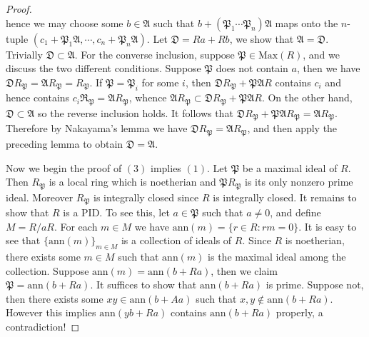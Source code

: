 \begin{proof}
$$$$
hence we may choose some $b\in\mathfrak{A}$ such that $b+(\mathfrak{P}_1\cdots\mathfrak{P}_n)\mathfrak{A}$ maps onto the $n$-tuple $(c_1+\mathfrak{P}_1\mathfrak{A},\cdots,c_n+\mathfrak{P}_n\mathfrak{A})$. Let $\mathfrak{D}=Ra+Rb$, we show that $\mathfrak{A}=\mathfrak{D}$. Trivially $\mathfrak{D}\subset\mathfrak{A}$. For the converse inclusion, suppose $\mathfrak{P}\in\mathrm{Max}(R)$, and we discuss the two different conditions. Suppose $\mathfrak{P}$ does not contain $a$, then we have $\mathfrak{D}R_\mathfrak{P}=\mathfrak{A}R_\mathfrak{P}=R_\mathfrak{P}$. If $\mathfrak{P}=\mathfrak{P}_i$ for some $i$, then $\mathfrak{D}R_\mathfrak{P}+\mathfrak{P}\mathfrak{A}R$ contains $c_i$ and hence contains $c_i\mathfrak{R}_\mathfrak{P}=\mathfrak{A}R_\mathfrak{P}$, whence $\mathfrak{A}R_\mathfrak{P}\subset\mathfrak{D}R_\mathfrak{P}+\mathfrak{P}\mathfrak{A}R$. On the other hand, $\mathfrak{D}\subset\mathfrak{A}$ so the reverse inclusion holds. It follows that $\mathfrak{D}R_\mathfrak{P}+\mathfrak{P}\mathfrak{A}R_\mathfrak{P}=\mathfrak{A}R_\mathfrak{P}$. Therefore by Nakayama's lemma we have $\mathfrak{D}R_\mathfrak{P}=\mathfrak{A}R_\mathfrak{P}$, and then apply the preceding lemma to obtain $\mathfrak{D}=\mathfrak{A}$.\par
Now we begin the proof of $(3)$ implies $(1)$. Let $\mathfrak{P}$ be a maximal ideal of $R$. Then $R_\mathfrak{P}$ is a local ring which is noetherian and $\mathfrak{P}R_\mathfrak{P}$ is its only nonzero prime ideal. Moreover $R_\mathfrak{P}$ is integrally closed since $R$ is integrally closed. It remains to show that $R$ is a PID. To see this, let $a\in\mathfrak{P}$ such that $a\ne 0$, and define $M=R/aR$. For each $m\in M$ we have $\mathrm{ann}(m)=\{r\in R:rm=0\}$. It is easy to see that $\{\mathrm{ann}(m)\}_{m\in M}$ is a collection of ideals of $R$. Since $R$ is noetherian, there exists some $m\in M$ such that $\mathrm{ann}(m)$ is the maximal ideal among the collection. Suppose $\mathrm{ann}(m)=\mathrm{ann}(b+Ra)$, then we claim $\mathfrak{P}=\mathrm{ann}(b+Ra)$. It suffices to show that $\mathrm{ann}(b+Ra)$ is prime. Suppose not, then there exists some $xy\in\mathrm{ann}(b+Aa)$ such that $x,y\notin\mathrm{ann}(b+Ra)$. However this implies $\mathrm{ann}(yb+Ra)$ contains $\mathrm{ann}(b+Ra)$ properly, a contradiction!\par

\end{proof}
